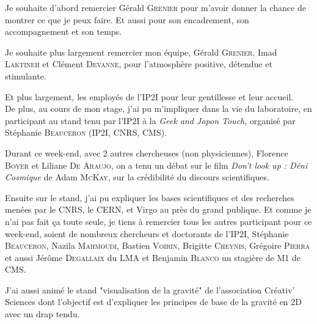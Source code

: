 Je souhaite d'abord remercier Gérald \textsc{Grenier} pour m'avoir donner la chance de montrer ce que je peux faire. Et aussi pour son encadrement, son accompagnement et son temps.

Je souhaite plus largement remercier mon équipe, Gérald \textsc{Grenier}, Imad \textsc{Laktineh} et Clément \textsc{Devanne}, pour l'atmosphère positive, détendue et stimulante.

Et plus largement, les employés de l'IP2I pour leur gentillesse et leur accueil.\\


De plus, au cours de mon stage, j'ai pu m'impliquer dans la vie du laboratoire, en participant au stand tenu par l'IP2I à la \textit{Geek and Japon Touch}, organisé par Stéphanie \textsc{Beauceron} (IP2I, CNRS, CMS).

Durant ce week-end, avec 2 autres chercheuses (non physiciennes), Florence \textsc{Boyer} et Liliane \textsc{De Araujo}, on a tenu un débat sur le film \textit{Don't look up : Déni Cosmique} de Adam \textsc{McKay}, sur la crédibilité du discours scientifiques.

Ensuite sur le stand, j'ai pu expliquer les bases scientifiques et des recherches menées par le CNRS, le CERN, et Virgo au près du grand publique. 
Et comme je n'ai pas fait ça toute seule, je tiens à remercier tous les autres participant pour ce week-end, soient de nombreux chercheurs et doctorants de l'IP2I, Stéphanie \textsc{Beauceron}, Nazila \textsc{Mahmoudi}, Bastien \textsc{Voirin}, Brigitte \textsc{Cheynis}, Grégoire \textsc{Pierra} et aussi Jérôme \textsc{Degallaix} du LMA et Benjamin \textsc{Blanco} un stagière de M1 de CMS.

J'ai aussi animé le stand "visualisation de la gravité" de l'association Créativ' Sciences dont l'objectif est d'expliquer les principes de base de la gravité en 2D avec un drap tendu.
